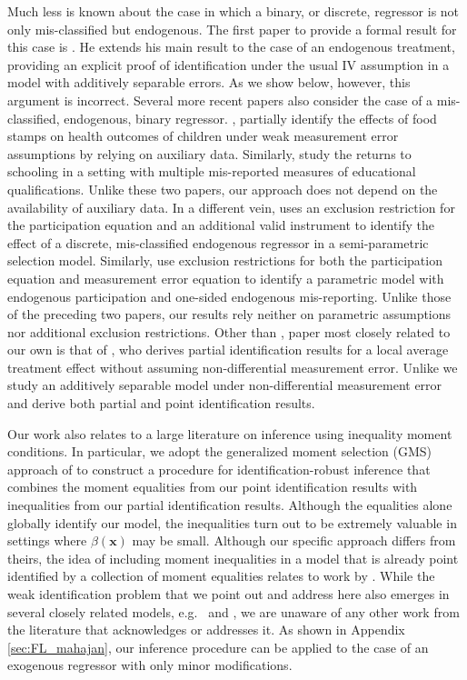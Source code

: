 Much less is known about the case in which a binary, or discrete, regressor is not only mis-classified but endogenous.
The first paper to provide a formal result for this case is \cite{Mahajan}.
He extends his main result to the case of an endogenous treatment, providing an explicit proof of identification under the usual IV assumption in a model with additively separable errors.
As we show below, however, this argument is incorrect.
Several more recent papers also consider the case of a mis-classified, endogenous, binary regressor.
\cite{kreider2012}, partially identify the effects of food stamps on health outcomes of children under weak measurement error assumptions by relying on auxiliary data.
Similarly, \cite{Batt} study the returns to schooling in a setting with multiple mis-reported measures of educational qualifications.
Unlike these two papers, our approach does not depend on the availability of auxiliary data.
In a different vein, \cite{shiu2015} uses an exclusion restriction for the participation equation and an additional valid instrument to identify the effect of a discrete, mis-classified endogenous regressor in a semi-parametric selection model.
Similarly, \cite{nguimkeu2016estimation} use exclusion restrictions for both the participation equation and measurement error equation to identify a parametric model with endogenous participation and one-sided endogenous mis-reporting. 
Unlike those of the preceding two papers, our results rely neither on parametric assumptions nor additional exclusion restrictions.
Other than \cite{Mahajan}, paper most closely related to our own is that of \cite{Ura}, who derives partial identification results for a local average treatment effect without assuming non-differential measurement error.
Unlike \cite{Ura} we study an additively separable model under non-differential measurement error and derive both partial and point identification results.

Our work also relates to a large literature on inference using inequality moment conditions.
In particular, we adopt the generalized moment selection (GMS) approach of \cite{AndrewsSoares} to construct a procedure for identification-robust inference that combines the moment equalities from our point identification results with inequalities from our partial identification results.
Although the equalities alone globally identify our model, the inequalities turn out to be extremely valuable in settings where $\beta(\mathbf{x})$ may be small. 
Although our specific approach differs from theirs, the idea of including moment inequalities in a model that is already point identified by a collection of moment equalities relates to work by \cite{moon2009estimation}. 
While the weak identification problem that we point out and address here also emerges in several closely related models, e.g.\ \citep{Mahajan} and \cite{FL}, we are unaware of any other work from the literature that acknowledges or addresses it.
As shown in Appendix \ref{sec:FL_mahajan}, our inference procedure can be applied to the case of an exogenous regressor with only minor modifications.

